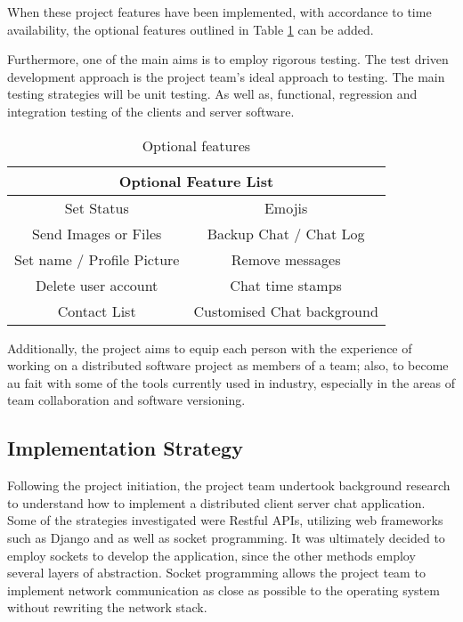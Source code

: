 \documentclass[11pt,a4paper]{article}
\begin{document}
When these project features have been implemented, with accordance to time availability, the optional features outlined in Table \ref{Table: feat_opt} can be added.

Furthermore, one of the main aims is to employ rigorous testing. The test driven development approach is the project team's ideal approach to testing. The main testing strategies will be unit testing. As well as, functional, regression and integration testing of the clients and server software.

\begin {table}[H]
\begin{center}
\begin{tabular}{|c|c|}
\hline 
\multicolumn{2}{|c|}{\textbf{Optional Feature List}}\\
\hline 
\rule[-1ex]{0pt}{2.5ex} Set Status & Emojis \\ 
\hline 
\rule[-1ex]{0pt}{2.5ex} Send Images or Files & Backup Chat / Chat Log \\ 
\hline 
\rule[-1ex]{0pt}{2.5ex} Set name / Profile Picture & Remove messages \\ 
\hline 
\rule[-1ex]{0pt}{2.5ex} Delete user account & Chat time stamps  \\ 
\hline 
\rule[-1ex]{0pt}{2.5ex} Contact List  & Customised Chat background  \\ 
\hline 
\end{tabular} 
\caption{Optional features}\label{Table: feat_opt}
\end{center}
\end {table}

Additionally, the project aims to equip each person with the experience of working on a distributed software project as members of a team; also, to become au fait with some of the tools currently used in industry, especially in the areas of team collaboration and software versioning. 


\subsection{Implementation Strategy}
Following the project initiation, the project team undertook background research to understand how to implement a distributed client server chat application. Some of the strategies investigated were Restful APIs, utilizing web frameworks such as Django and as well as socket programming. It was ultimately decided to employ sockets to develop the application, since the other methods employ several layers of abstraction. Socket programming allows the project team to implement network communication as close as possible to the operating system without rewriting the network stack.
\end{document}
